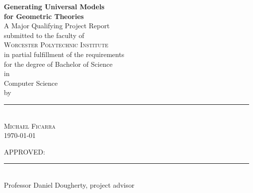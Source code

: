 \begin{titlepage}
	\begin{center}
		\textbf{
			{\Large Generating Universal Models}\\[0.3cm]
			{\Large for Geometric Theories}
		}\\[1cm]
		A Major Qualifying Project Report\\
		submitted to the faculty of\\[0.7cm]
		\textsc{ \large Worcester Polytechnic Institute }\\[0.7cm]
		in partial fulfillment of the requirements\\
		for the degree of Bachelor of Science\\[0.5cm]
		in\\[0.5cm]
		Computer Science\\[0.5cm]
		by\\[1cm]
		\rule{3in}{1.2pt}\\
		\textsc{\large Michael Ficarra}\\[1.2cm]
		\monthyeardate
		{\large \today}\\
	\end{center}
	\vfill
		APPROVED:\\[1.2cm]
		\rule{3in}{0.8pt}\\
		Professor Daniel Dougherty, project advisor\\
\end{titlepage}
